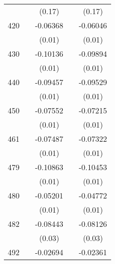 \begin{table}[htbp]
\begin{tabular}{l*{4}{c}}
                    &                     &      (0.17)         &                     &      (0.17)         \\
420                 &                     &    -0.06368\sym{***}&                     &    -0.06046\sym{***}\\
                    &                     &      (0.01)         &                     &      (0.01)         \\
430                 &                     &    -0.10136\sym{***}&                     &    -0.09894\sym{***}\\
                    &                     &      (0.01)         &                     &      (0.01)         \\
440                 &                     &    -0.09457\sym{***}&                     &    -0.09529\sym{***}\\
                    &                     &      (0.01)         &                     &      (0.01)         \\
450                 &                     &    -0.07552\sym{***}&                     &    -0.07215\sym{***}\\
                    &                     &      (0.01)         &                     &      (0.01)         \\
461                 &                     &    -0.07487\sym{***}&                     &    -0.07322\sym{***}\\
                    &                     &      (0.01)         &                     &      (0.01)         \\
479                 &                     &    -0.10863\sym{***}&                     &    -0.10453\sym{***}\\
                    &                     &      (0.01)         &                     &      (0.01)         \\
480                 &                     &    -0.05201\sym{***}&                     &    -0.04772\sym{***}\\
                    &                     &      (0.01)         &                     &      (0.01)         \\
482                 &                     &    -0.08443\sym{**} &                     &    -0.08126\sym{**} \\
                    &                     &      (0.03)         &                     &      (0.03)         \\
492                 &                     &    -0.02694         &                     &    -0.02361         \\

\end{tabular}
\end{table}
